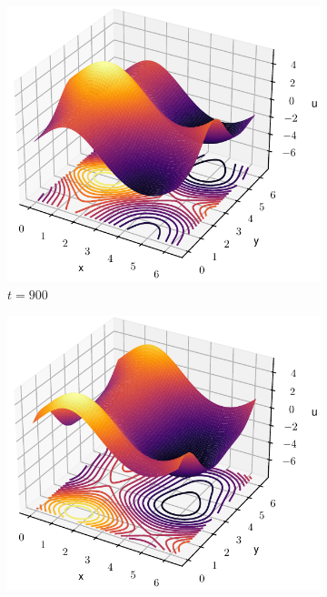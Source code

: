 \documentclass[twoside]{article}
\begin{document}
\begin{figure}[ht]
  \centering
  \begin{subfigure}[b]{0.33\textwidth}
    \includegraphics[width=\textwidth]{images/slice_nu1_0.85_nu2_0.3_time_900.0.pdf}
    \caption{$t=900$}
  \end{subfigure}\hfill
  \begin{subfigure}[b]{0.33\textwidth}
    \includegraphics[width=\textwidth]{images/slice_nu1_0.85_nu2_0.3_time_917.294.pdf}

\end{subfigure}
\end{figure}
\end{document}
